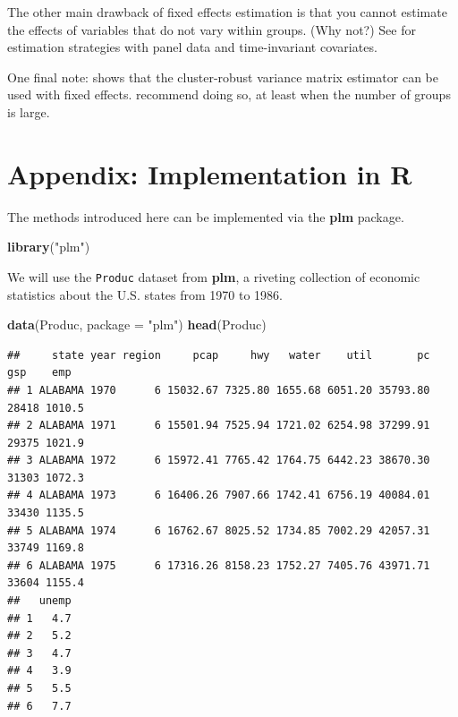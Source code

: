 \documentclass[
  12pt,
  oneside,openany]{book}
\newenvironment{Shaded}{\begin{snugshade}}{\end{snugshade}}
\newcommand{\DataTypeTok}[1]{\textcolor[rgb]{0.13,0.29,0.53}{#1}}
\newcommand{\KeywordTok}[1]{\textcolor[rgb]{0.13,0.29,0.53}{\textbf{#1}}}
\newcommand{\NormalTok}[1]{#1}
\newcommand{\StringTok}[1]{\textcolor[rgb]{0.31,0.60,0.02}{#1}}
\begin{document}
The other main drawback of fixed effects estimation is that you cannot estimate the effects of variables that do not vary within groups. (Why not?) See \citet[section 13.5]{greene} for estimation strategies with panel data and time-invariant covariates.

One final note: \citet{Arellano:1987jx} shows that the cluster-robust variance matrix estimator can be used with fixed effects. \citet{Cameron:2015ud} recommend doing so, at least when the number of groups is large.

\hypertarget{appendix-implementation-in-r-1}{%
\section{Appendix: Implementation in R}\label{appendix-implementation-in-r-1}}

The methods introduced here can be implemented via the \textbf{plm} package.

\begin{Shaded}
\begin{Highlighting}[]
\KeywordTok{library}\NormalTok{(}\StringTok{"plm"}\NormalTok{)}
\end{Highlighting}
\end{Shaded}

We will use the \texttt{Produc} dataset from \textbf{plm}, a riveting collection of economic statistics about the U.S. states from 1970 to 1986.

\begin{Shaded}
\begin{Highlighting}[]
\KeywordTok{data}\NormalTok{(Produc, }\DataTypeTok{package =} \StringTok{"plm"}\NormalTok{)}
\KeywordTok{head}\NormalTok{(Produc)}
\end{Highlighting}
\end{Shaded}

\begin{verbatim}
##     state year region     pcap     hwy   water    util       pc   gsp    emp
## 1 ALABAMA 1970      6 15032.67 7325.80 1655.68 6051.20 35793.80 28418 1010.5
## 2 ALABAMA 1971      6 15501.94 7525.94 1721.02 6254.98 37299.91 29375 1021.9
## 3 ALABAMA 1972      6 15972.41 7765.42 1764.75 6442.23 38670.30 31303 1072.3
## 4 ALABAMA 1973      6 16406.26 7907.66 1742.41 6756.19 40084.01 33430 1135.5
## 5 ALABAMA 1974      6 16762.67 8025.52 1734.85 7002.29 42057.31 33749 1169.8
## 6 ALABAMA 1975      6 17316.26 8158.23 1752.27 7405.76 43971.71 33604 1155.4
##   unemp
## 1   4.7
## 2   5.2
## 3   4.7
## 4   3.9
## 5   5.5
## 6   7.7
\end{verbatim}
\end{document}
